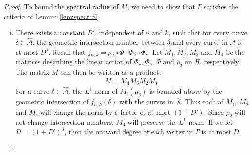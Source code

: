 \begin{proof}

To bound the spectral radius of $M$, we need to show that $\Gamma$ satisfies
the criteria of Lemma \ref{lem:spectral}.


\begin{enumerate}[(i)]
\item There exists a constant $D'$, independent of $n$ and
  $k$, such that for every curve $\delta \in \widehat{\mathcal{A}}$, the geometric
  intersection number between $\delta$ and every curve in $\overline{\mathcal{A}}$ is at most $D'$. %
  Recall that $f_{n,k}=\rho_2\circ\Phi\circ\Phi_b\circ\Phi_r$.  Let $M_1,M_2,M_3$ and $M_4$ be the matrices describing the linear action of $\Phi_r,\,\Phi_b,\,\Phi$ and $\rho_2$ on $H$, respectively. The matrix
  $M$ can then be written as a product:
  \begin{align*}
    M = M_4M_3M_2M_1.
  \end{align*}
  For a curve $\delta \in \widehat{\mathcal{A}}$, the $L^1$-norm of $M_i(\mu_\delta)$ is bounded above by the geometric intersection of
  $f_{n,k}(\delta)$ with the curves in $\overline{\mathcal{A}}$.  Thus each of $M_1$, $M_2$ and $M_3$ will change the norm by
  a factor of at most $(1 + D')$. Since $\rho_2$ will not change intersection numbers, $M_4$ will preserve the
  $L^1$-norm. If we let $D = (1 + D')^3$, then the outward degree of each vertex in $\Gamma$ is at most $D$.


\end{enumerate}
\end{proof}
